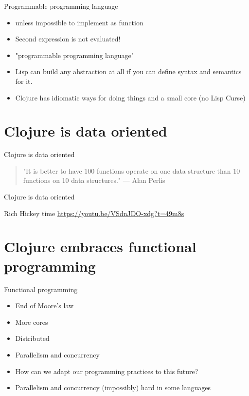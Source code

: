 \documentclass[presentation]{beamer}
\begin{document}
\begin{frame}[label={sec:orgheadline7}]{Programmable programming language}
\begin{itemize}
\item \alert{unless} impossible to implement as function
\item Second expression is not evaluated!
\item "programmable programming language"
\item Lisp can build any abstraction at all if you can define syntax and semantics for it.
\item Clojure has idiomatic ways for doing things and a small core (no Lisp Curse)
\end{itemize}
\end{frame}

\section{Clojure is data oriented}
\label{sec:orgheadline11}

\begin{frame}[label={sec:orgheadline9}]{Clojure is data oriented}
\begin{quotation}
"It is better to have 100 functions operate on one data structure than 10 functions on 10 data structures." --- Alan Perlis
\end{quotation}
\end{frame}

\begin{frame}[label={sec:orgheadline10}]{Clojure is data oriented}
\begin{alertblock}{Rich Hickey time}
\url{https://youtu.be/VSdnJDO-xdg?t=49m8s}
\end{alertblock}
\end{frame}

\section{Clojure embraces functional programming}
\label{sec:orgheadline16}

\begin{frame}[label={sec:orgheadline12}]{Functional programming}
\begin{itemize}
\item End of Moore's law
\item More cores
\item Distributed
\item Parallelism and concurrency
\item How can we adapt our programming practices to this future?
\item Parallelism and concurrency (impossibly) hard in some languages
\end{itemize}
\end{frame}
\end{document}

